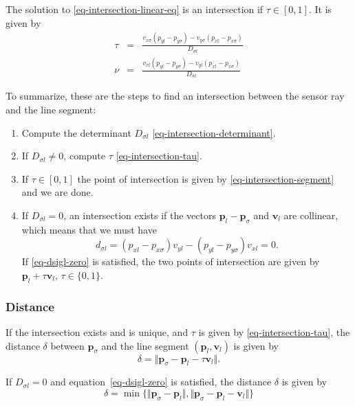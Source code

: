 \documentclass[11pt]{article}
\newcommand{\Dsigl}{D_{\sigma l}}
\newcommand{\dsigl}{d_{\sigma l}}
\newcommand{\pbl}{\mathbf{p}_l}
\newcommand{\pbsig}{\mathbf{p}_\sigma}
\newcommand{\pxl}{p_{xl}}
\newcommand{\pyl}{p_{yl}}
\newcommand{\pxsig}{p_{x\sigma}}
\newcommand{\pysig}{p_{y\sigma}}
\newcommand{\vbl}{\mathbf{v}_l}
\newcommand{\vxl}{v_{xl}}
\newcommand{\vyl}{v_{yl}}
\newcommand{\vxsig}{v_{x\sigma}}
\newcommand{\vysig}{v_{y\sigma}}
\begin{document}
The solution to \eqref{eq-intersection-linear-eq} is an intersection if
$\tau\in[0,1]$. It is given by
\begin{eqnarray}
\tau &=& \frac{\vxsig(\pyl - \pysig) - \vysig(\pxl - \pxsig)}{\Dsigl}
    \label{eq-intersection-tau}  \\
\nu &=& \frac{\vxl(\pyl-\pysig)-\vyl(\pxl-\pxsig)}{\Dsigl}
    \label{eq-intersection-nu}
\end{eqnarray}

To summarize, these are the steps to find an intersection between the sensor
ray and the line segment:
\begin{enumerate}
    \item Compute the determinant $\Dsigl$ \eqref{eq-intersection-determinant}.
    \item If $\Dsigl\neq 0$, compute $\tau$ \eqref{eq-intersection-tau}.
    \item If $\tau\in[0,1]$ the point of intersection is given by
        \eqref{eq-intersection-segment} and we are done.
    \item If $\Dsigl=0$, an intersection exists if the vectors $\pbl-\pbsig$ 
        and $\vbl$ are collinear, which means that we must have
        \begin{equation}
            \dsigl=(\pxl-\pxsig)\vyl - (\pyl - \pysig)\vxl=0.
            \label{eq-dsigl-zero}
        \end{equation}
        If \eqref{eq-dsigl-zero} is satisfied, the two points of intersection 
        are given by $\pbl+\tau\vbl,\,\tau\in\{0,1\}$. 
\end{enumerate}

\subsubsection*{Distance}
If the intersection exists and is unique, and $\tau$ is given by
\eqref{eq-intersection-tau}, the distance $\delta$ between $\pbsig$ and the 
line segment $(\pbl, \vbl)$ is given by
\begin{equation}
    \delta = \Vert \pbsig - \pbl - \tau\vbl\Vert.
    \label{eq-distance-line-segment-unique}
\end{equation}

If $\Dsigl=0$ and equation~\eqref{eq-dsigl-zero} is satisfied, the distance
$\delta$ is given by
\begin{equation}
    \delta = \min\{\Vert\pbsig-\pbl\Vert, \Vert\pbsig-\pbl-\vbl\Vert\}
    \label{eq-distance-line-segment-collinear}
\end{equation}
\end{document}
